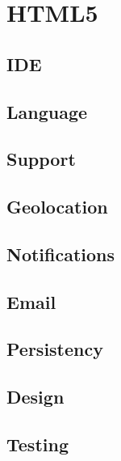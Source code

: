 \section{HTML5}
\subsection{IDE}

\subsection{Language}

\subsection{Support}

\subsection{Geolocation}

\subsection{Notifications}

\subsection{Email}

\subsection{Persistency}

\subsection{Design}

\subsection{Testing}

